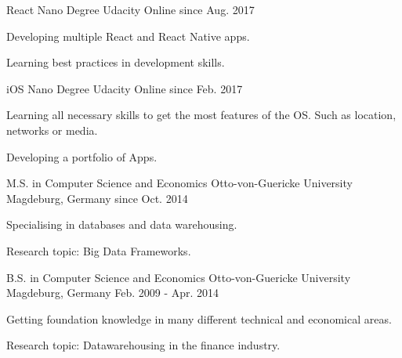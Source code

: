 

\begin{cventries}

     
   \cventry
    {React Nano Degree} %
    {Udacity} %
    {Online} %
    {since Aug. 2017} %
    {
      \begin{cvitems} %
          \item{Developing multiple React and React Native apps.}
          \item{Learning best practices in development skills.}
      \end{cvitems}
    }

   \cventry
    {iOS Nano Degree} %
    {Udacity} %
    {Online} %
    {since Feb. 2017} %
    {
      \begin{cvitems} %
          \item{Learning all necessary skills to get the most features of the OS. Such as location, networks or media.}
          \item{Developing a portfolio of Apps.}
      \end{cvitems}
    }
    
   \cventry
    {M.S. in Computer Science and Economics} %
    {Otto-von-Guericke University} %
    {Magdeburg, Germany} %
    {since Oct. 2014} %
    {
      \begin{cvitems} %
          \item{Specialising in databases and data warehousing.}
          \item{Research topic: Big Data Frameworks.}
      \end{cvitems}
    }
    
   \cventry
    {B.S. in Computer Science and Economics} %
    {Otto-von-Guericke University} %
    {Magdeburg, Germany} %
    {Feb. 2009 - Apr. 2014} %
    {
      \begin{cvitems} %
          \item{Getting foundation knowledge in many different technical and economical areas.}
          \item{Research topic: Datawarehousing in the finance industry.}
      \end{cvitems}
    }
\end{cventries}
